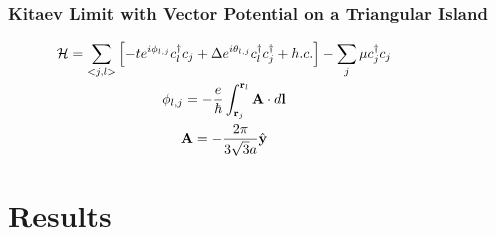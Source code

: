 \documentclass[xcolor=dvipsnames,10pt,aspectratio=169]{beamer}
\let\oldhat\hat
\renewcommand{\hat}[1]{\oldhat{\mathbf{#1}}}
\renewcommand{\vec}[1]{\mathbf{#1}}
\newcommand{\ham}{\mathcal{H}}
\newcommand{\cc}{c^{\dagger}}
\newcommand{\de}{\Delta}
\newcommand{\RE}{Results}
\begin{document}
  \begin{frame}
    \frametitle{Kitaev Limit with Vector Potential on a Triangular Island}

    \begin{multicols}{2}

      \small
      \begin{gather*}
        \hspace{-5em}
        \ham = \sum_{<j,l>} \left[ -t e^{i\phi_{l,j}}\cc_{l} c_j + \de e^{i\theta_{l,j}} \cc_{l}\cc_j + h.c.\right] - \sum_j \mu \cc_j c_j \\
        \hspace{-5em}
        \phi_{l,j} = -\dfrac{e}{\hbar}\int_{\vec{r}_j}^{\vec{r}_l} \vec{A} \cdot d\vec{l} \\
        \hspace{-5em}
        \vec{A} = -\dfrac{2 \pi}{3\sqrt{3} a} \hat{y}
      \end{gather*}

    \end{multicols}

  \end{frame}

  \section{\RE}
\end{document}
